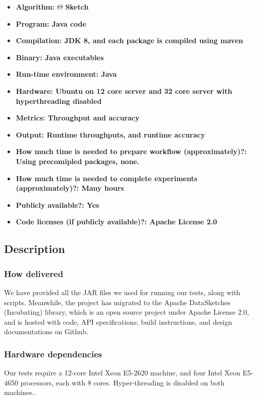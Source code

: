 \documentclass[onecolumn]{sigplanconf}
\begin{document}
{\small
\begin{itemize}
  \item {\bf Algorithm: $\Theta$ Sketch}
  \item {\bf Program: Java code}
  \item {\bf Compilation: JDK 8, and each package is compiled using maven}
  \item {\bf Binary: Java executables}
  \item {\bf Run-time environment: Java}
  \item {\bf Hardware: Ubuntu on 12 core server and 32 core server with hyperthreading disabled}
  \item {\bf Metrics: Throughput and accuracy}
  \item {\bf Output: Runtime throughputs, and runtime accuracy}
  \item {\bf How much time is needed to prepare workflow (approximately)?: Using precomipled packages, none.}
  \item {\bf How much time is needed to complete experiments (approximately)?: Many hours}
  \item {\bf Publicly available?: Yes}
  \item {\bf Code licenses (if publicly available)?: Apache License 2.0}
\end{itemize}

\subsection{Description}

\subsubsection{How delivered}

We have provided all the JAR files we used for running our tests, along with scripts. Meanwhile, the project
has migrated to the Apache DataSketches (Incubating) library, which is an open source project
under Apache License 2.0, and is hosted with code, API specifications,
build instructions, and design documentations on Github.

\subsubsection{Hardware dependencies}
Our tests require a 12-core Intel Xeon E5-2620 machine, and four Intel
Xeon E5-4650 processors, each with $8$ cores. Hyper-threading is disabled on both machines..

}
\end{document}
